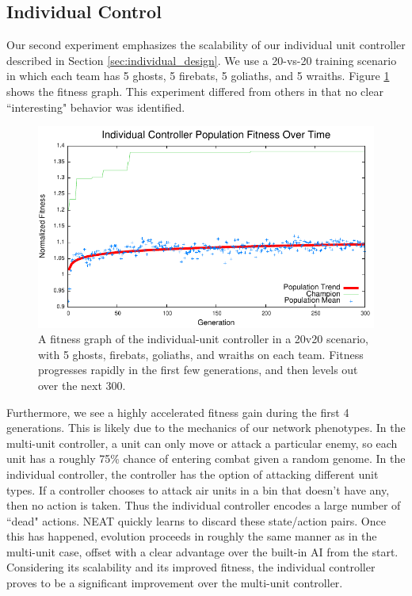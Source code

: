\documentclass[10pt,a4paper,twocolumn]{article}
\begin{document}
\subsection{Individual Control}

Our second experiment emphasizes the scalability of our individual unit controller described in Section \ref{sec:individual_design}. We use a 20-vs-20 training scenario in which each team has 5 ghosts, 5 firebats, 5 goliaths, and 5 wraiths. Figure \ref{fig:individual_exp} shows the fitness graph. This experiment differed from others in that no clear ``interesting" behavior was identified.

\begin{figure}
\centering
\includegraphics[scale=.59]{plots/individual.pdf}
\caption{A fitness graph of the individual-unit controller in a 20v20 scenario, with 5 ghosts, firebats, goliaths, and wraiths on each team. Fitness progresses rapidly in the first few generations, and then levels out over the next 300.}
\label{fig:individual_exp}
\end{figure}

Furthermore, we see a highly accelerated fitness gain during the first 4 generations. This is likely due to the mechanics of our network phenotypes. In the multi-unit controller, a unit can only move or attack a particular enemy, so each unit has a roughly 75\% chance of entering combat given a random genome. In the individual controller, the controller has the option of attacking different unit types. If a controller chooses to attack air units in a bin that doesn't have any, then no action is taken. Thus the individual controller encodes a large number of ``dead" actions. NEAT quickly learns to discard these state/action pairs. Once this has happened, evolution proceeds in roughly the same manner as in the multi-unit case, offset with a clear advantage over the built-in AI from the start. Considering its scalability and its improved fitness, the individual controller proves to be a significant improvement over the multi-unit controller.
\end{document}
